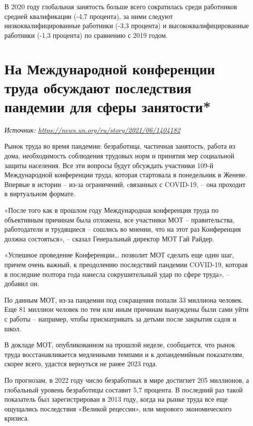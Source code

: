 В 2020 году глобальная занятость больше всего сократилась среди работников средней квалификации (-4,7 процента), за ними следуют низкоквалифицированные работники (-3,3 процента) и высококвалифицированные работники (-1,3 процента) по сравнению с 2019 годом.


\newpage
\section[Последствия пандемии для сферы занятости]{На Международной конференции труда обсуждают последствия пандемии для сферы занятости*}

\textit{Источник: \url{https://news.un.org/ru/story/2021/06/1404182}}

\begin{fancyquotes}
    Рынок труда во время пандемии: безработица, частичная занятость, работа из дома, необходимость соблюдения трудовых норм и принятия мер социальной защиты населения. Все эти вопросы будут обсуждать участники 109-й Международной конференции труда, которая стартовала в понедельник в Женеве. Впервые в истории – из-за ограничений, cвязанных с COVID-19, – она проходит в виртуальном формате.
\end{fancyquotes}

«После того как в прошлом году Международная конференция труда по объективным причинам была отложена, все участники МОТ – правительства, работодатели и трудящиеся – сошлись во мнении, что на этот раз Конференция должна состояться», – сказал Генеральный директор МОТ Гай Райдер.


«Успешное проведение Конференции… позволит МОТ сделать еще один шаг, причем очень важный, к преодолению последствий пандемии COVID-19, которая в последние полтора года нанесла сокрушительный удар по сфере труда», – добавил он.

По данным МОТ, из-за пандемии под сокращения попали 33 миллиона человек. Еще 81 миллион человек по тем или иным причинам вынуждены были сами уйти с работы – например, чтобы присматривать за детьми после закрытия садов и школ.

В докладе МОТ, опубликованном на прошлой неделе, сообщается, что рынок труда восстанавливается медленными темпами и к допандемийным показателям, скорее всего, удастся вернуться не ранее 2023 года.

По прогнозам, в 2022 году число безработных в мире достигнет 205 миллионов, а глобальный уровень безработицы составит 5,7 процента. В последний раз такой показатель был зарегистрирован в 2013 году, когда на рынке труда все еще ощущались последствия «Великой рецессии», или мирового экономического кризиса.


